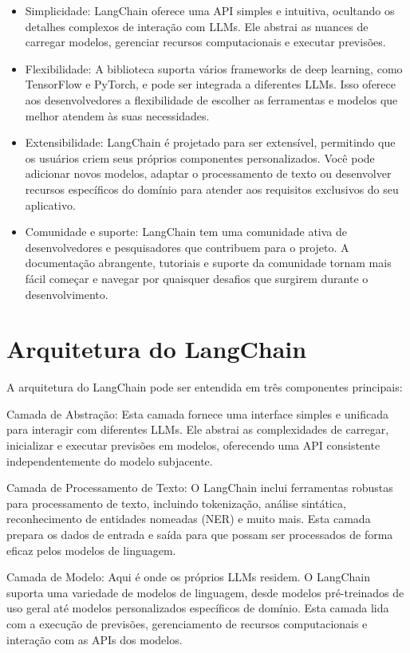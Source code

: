 \documentclass[a4paper,oneside]{book}
\begin{document}
\begin{itemize}
    \item Simplicidade: LangChain oferece uma API simples e intuitiva, ocultando os detalhes complexos de interação com LLMs. Ele abstrai as nuances de carregar modelos, gerenciar recursos computacionais e executar previsões.
    
    \item Flexibilidade: A biblioteca suporta vários frameworks de deep learning, como TensorFlow e PyTorch, e pode ser integrada a diferentes LLMs. Isso oferece aos desenvolvedores a flexibilidade de escolher as ferramentas e modelos que melhor atendem às suas necessidades.
    
    \item Extensibilidade: LangChain é projetado para ser extensível, permitindo que os usuários criem seus próprios componentes personalizados. Você pode adicionar novos modelos, adaptar o processamento de texto ou desenvolver recursos específicos do domínio para atender aos requisitos exclusivos do seu aplicativo.
    
    \item Comunidade e suporte: LangChain tem uma comunidade ativa de desenvolvedores e pesquisadores que contribuem para o projeto. A documentação abrangente, tutoriais e suporte da comunidade tornam mais fácil começar e navegar por quaisquer desafios que surgirem durante o desenvolvimento.
    
\end{itemize}
\section{Arquitetura do LangChain}

A arquitetura do LangChain pode ser entendida em três componentes principais:

Camada de Abstração: Esta camada fornece uma interface simples e unificada para interagir com diferentes LLMs. Ele abstrai as complexidades de carregar, inicializar e executar previsões em modelos, oferecendo uma API consistente independentemente do modelo subjacente.

Camada de Processamento de Texto: O LangChain inclui ferramentas robustas para processamento de texto, incluindo tokenização, análise sintática, reconhecimento de entidades nomeadas (NER) e muito mais. Esta camada prepara os dados de entrada e saída para que possam ser processados de forma eficaz pelos modelos de linguagem.

Camada de Modelo: Aqui é onde os próprios LLMs residem. O LangChain suporta uma variedade de modelos de linguagem, desde modelos pré-treinados de uso geral até modelos personalizados específicos de domínio. Esta camada lida com a execução de previsões, gerenciamento de recursos computacionais e interação com as APIs dos modelos.
\end{document}
